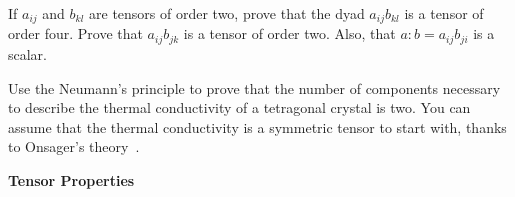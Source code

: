 
\begin{question}
If $a_{ij}$ and $b_{kl}$ are tensors of order two, prove that the dyad $a_{ij} b_{kl}$ is a tensor of order four. Prove that $a_{ij} b_{jk}$ is a tensor of order two. Also, that $a:b = a_{ij}b_{ji}$ is a scalar.
\end{question}
\begin{solution}[print]
\end{solution}


\begin{question}
Use the Neumann's principle to prove that the number of components necessary to describe the thermal conductivity of a tetragonal crystal is two. You can assume that the thermal conductivity is a symmetric tensor to start with, thanks to Onsager's theory~\cite{onsager1, onsager2}.
\end{question}
\begin{solution}[print]
\end{solution}


\begin{center}
{\bf \Large Tensor Properties}
\end{center}

